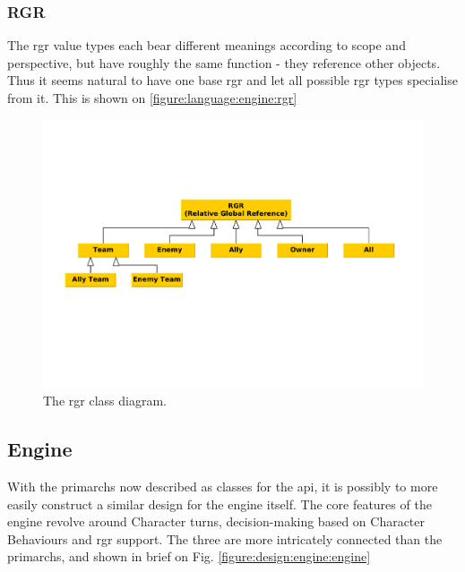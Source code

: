 \subsubsection*{RGR}
The \ac{rgr} value types each bear different meanings according to scope and perspective, but have roughly the same function - they reference other objects. Thus it seems natural to have one base \ac{rgr} and let all possible \ac{rgr} types specialise from it. This is shown on \vref{figure:language:engine:rgr}

\begin{figure}
\centering
\includegraphics[scale=.4, clip=true, trim=0cm 8cm 0cm 6cm]{img/rgr_class_diagram}
\caption{\label{figure:language:engine:rgr}The \ac{rgr} class diagram.}
\end{figure}

\subsection{Engine}
With the primarchs now described as classes for the \ac{api}, it is possibly to more easily construct a similar design for the engine itself. The core features of the engine revolve around Character turns, decision-making based on Character Behaviours and \ac{rgr} support. The three are more intricately connected than the primarchs, and shown in brief on Fig. \vref{figure:design:engine:engine}

